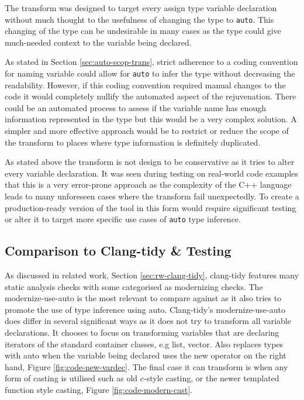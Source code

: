 \documentclass[bsc,frontabs,singlespacing,twoside,parskip,deptreport]{infthesis}
\begin{document}
The transform was designed to target every assign type variable declaration without much thought to the usefulness of changing the type to \texttt{auto}. This changing of the type can be undesirable in many cases as the type could give much-needed context to the variable being declared. 

As stated in Section \ref{sec:auto-scop-trans}, strict adherence to a coding convention for naming variable could allow for \texttt{auto} to infer the type without decreasing the readability. However, if this coding convention required manual changes to the code it would completely nullify the automated aspect of the rejuvenation. There could be an automated process to assess if the variable name has enough information represented in the type but this would be a very complex solution. A simpler and more effective approach would be to restrict or reduce the scope of the transform to places where type information is definitely duplicated.


As stated above the transform is not design to be conservative as it tries to alter every variable declaration. It was seen during testing on real-world code examples that this is a very error-prone approach as the complexity of the C++ language leads to many unforeseen cases where the transform fail unexpectedly. To create a production-ready version of the tool in this form would require significant testing or alter it to target more specific use cases of \texttt{auto} type inference.

\subsection{Comparison to Clang-tidy \& Testing }\label{sec:cmp-auto-reju-mod-auto}


As discussed in related work, Section \ref{sec:rw-clang-tidy}, clang-tidy features many static analysis checks with some categorised as modernizing checks. The modernize-use-auto \cite{CLANG_AUTO} is the most relevant to compare against as it also tries to promote the use of type inference using auto. Clang-tidy's modernize-use-auto does differ in several significant ways as it does not try to transform all variable declarations. It chooses to focus on transforming variables that are declaring iterators of the standard container classes, e.g list, vector. Also replaces types with auto when the variable being declared uses the new operator on the right hand, Figure \ref{fig:code-new-vardec}. The final case it can transform is when any form of casting is utilised such as old c-style casting, or the newer templated function style casting, Figure \ref{fig:code-modern-cast}.
\end{document}
